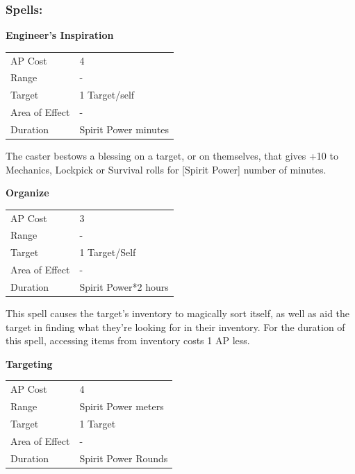 \documentclass[11pt,a4paper,twocolumn]{book}
\begin{document}
\pagebreak
\subsubsection*{Spells:}

\smallskip
\noindent
\textbf{Engineer's Inspiration}

\smallskip
{
	\begin{tabu} to 70mm{| X[l,4] | X[l,7] |}
		\hline
        AP Cost	      	& 4 						\\
        Range     		& -							\\
        Target      	& 1 Target/self				\\
        Area of Effect  & -  	 					\\
        Duration     	& Spirit Power minutes		\\ \hline
	\end{tabu}
		
}
\smallskip

The caster bestows a blessing on a target, or on themselves, that gives +10 to Mechanics, Lockpick or Survival rolls for [Spirit Power] number of minutes.

\bigskip
\noindent
\textbf{Organize}

\smallskip
{
	\begin{tabu} to 70mm{| X[l,4] | X[l,7] |}
		\hline
        AP Cost	      	& 3 						\\
        Range     		& -							\\
        Target      	& 1 Target/Self				\\
        Area of Effect  & -  	 					\\
        Duration     	& Spirit Power*2 hours		\\ \hline
	\end{tabu}
		
}
\smallskip

This spell causes the target's inventory to magically sort itself, as well as aid the target in finding what they're looking for in their inventory. For the duration of this spell, accessing items from inventory costs 1 AP less.

\bigskip
\noindent
\textbf{Targeting}

\smallskip
{
	\begin{tabu} to 70mm{| X[l,4] | X[l,7] |}
		\hline
        AP Cost	      	& 4 						\\
        Range     		& Spirit Power meters		\\
        Target      	& 1 Target					\\
        Area of Effect  & -  	 					\\
        Duration     	& Spirit Power Rounds		\\ \hline
	\end{tabu}
		
}
\smallskip
\end{document}
